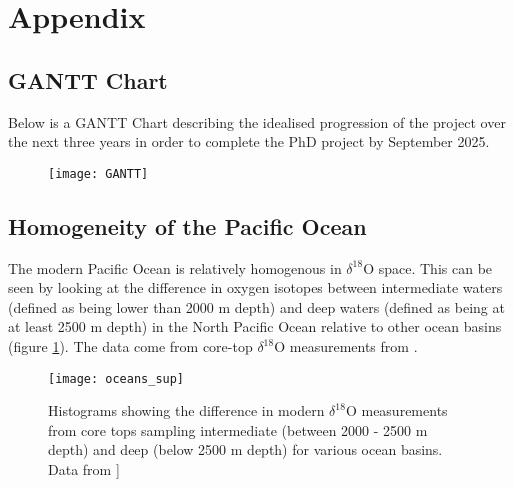 \section{Appendix}

\subsection{GANTT Chart}

Below is a GANTT Chart describing the idealised progression of the project over the next three years in order to complete the PhD project by September 2025. 

\begin{figure}[h]
    \centering
    \texttt{[image: GANTT]}
\end{figure}

\newpage

\subsection{Homogeneity of the Pacific Ocean}

The modern Pacific Ocean is relatively homogenous in $\delta^{18}\text{O}$ space. This can be seen by looking at the difference in oxygen isotopes between intermediate waters (defined as being lower than 2000 m depth) and deep waters (defined as being at at least 2500 m depth) in the North Pacific Ocean relative to other ocean basins (figure \ref{fig:oceans_sup}). The data come from core-top $\delta^{18}\text{O}$ measurements from \citep{schmittnerCalibrationCarbonIsotope2017}.

\begin{figure}[h]
    \centering
    \texttt{[image: oceans\_sup]}
    \caption{Histograms showing the difference in modern $\delta^{18}\text{O}$ measurements from core tops sampling intermediate (between 2000 - 2500 m depth) and deep (below 2500 m depth) for various ocean basins. Data from \citet{schmittnerCalibrationCarbonIsotope2017}]}
    \label{fig:oceans_sup}
\end{figure}

